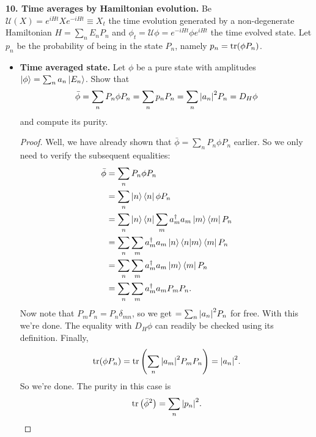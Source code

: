 \documentclass{book}
\theoremstyle{definition}
\newcommand{\nn}{\nonumber}
\newcommand{\lp}{\left(}
\newcommand{\rp}{\right)}
\begin{document}
  















\noindent \textbf{10. Time averages by Hamiltonian evolution.} Be $\mathcal{U}(X) = e^{iHt} X e^{-iHt} \equiv X_t$ the time evolution generated by a non-degenerate Hamiltonian $H = \sum_n E_n P_n$ and $\phi_t = \mathcal{U}\phi = e^{-iHt}\phi e^{iHt}$ the time evolved state. Let $p_n$ be the probability of being in the state $P_n$, namely $p_n = \tr(\phi P_n)$. 

\begin{itemize}
	\item \textbf{Time averaged state.} Let $\phi$ be a pure state with amplitudes $\ket{\phi} = \sum_n a_n \ket{E_n}$. Show that   
	\begin{align}
	\bar{\phi} = \sum_n P_n \phi P_n = \sum_n p_n P_n = \sum_n \abs{a_n}^2 P_n = D_H \phi
	\end{align}
	and compute its purity. 
	
	\begin{proof}
		 Well, we have already shown that $\bar{\phi} = \sum_n P_n \phi P_n$ earlier. So we only need to verify the subsequent equalities:
		 \begin{align}
		 \bar\phi &= \sum_n P_n \phi P_n \nn\\
		 &= \sum_n \ket{n}\bra{n}\phi P_n\nn\\
		 &= \sum_n \ket{n} \bra{n}\sum_m a_m^\dagger a_m \ket{m}\bra{m} P_n\nn\\
		 &=  \sum_n  \sum_m a_m^\dagger a_m \ket{n} \braket{n}{m}\bra{m} P_n\nn\\
		 &= \sum_n  \sum_m a_m^\dagger a_m \ket{m} \bra{m} P_n\nn\\
		 &= \sum_n  \sum_m a_m^\dagger a_m P_m P_n.
		 \end{align}
		 Now note that $P_m P_n = P_n \delta_{mn}$, so we get $=\sum_n \abs{a_n}^2P_n$ for free. With this we're done. The equality with $D_H \phi$ can readily be checked using its definition. Finally,
		 \begin{align}
		 \tr(\phi P_n) = \tr\lp \sum_n \abs{a_m}^2 P_m  P_n \rp =  \abs{a_n}^2.
		 \end{align}
		 So we're done. The purity in this case is 
		 \begin{align}
		 \tr\lp \bar{\phi}^2 \rp = \sum_n \abs{p_n}^2.
		 \end{align}
	\end{proof}
	

\end{itemize}
\end{document}
